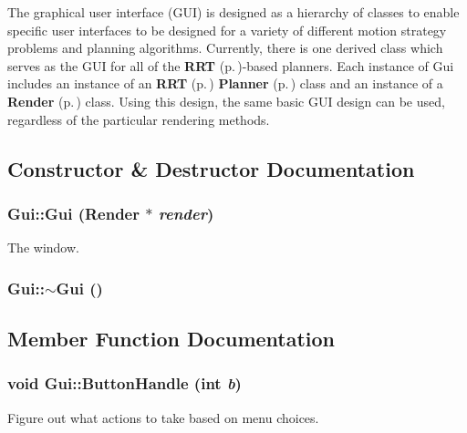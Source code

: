 The graphical user interface (GUI) is designed as a hierarchy of classes to enable specific user interfaces to be designed for a variety of different motion strategy problems and planning algorithms. Currently, there is one derived class which serves as the GUI for all of the {\bf RRT} {\rm (p.\,\pageref{classRRT})}-based planners. Each instance of Gui includes an instance of an {\bf RRT} {\rm (p.\,\pageref{classRRT})} {\bf Planner} {\rm (p.\,\pageref{classPlanner})} class and an instance of a {\bf Render} {\rm (p.\,\pageref{classRender})} class. Using this design, the same basic GUI design can be used, regardless of the particular rendering methods. 



\subsection{Constructor \& Destructor Documentation}
\subsubsection{\setlength{\rightskip}{0pt plus 5cm}Gui::Gui ({\bf Render} $\ast$ {\em render})}\label{classGui_a0}


The window.

\subsubsection{\setlength{\rightskip}{0pt plus 5cm}Gui::$\sim$Gui ()\hspace{0.3cm}{\tt  [inline, virtual]}}\label{classGui_a1}




\subsection{Member Function Documentation}
\subsubsection{\setlength{\rightskip}{0pt plus 5cm}void Gui::Button\-Handle (int {\em b})\hspace{0.3cm}{\tt  [inline, virtual]}}\label{classGui_a4}


Figure out what actions to take based on menu choices.



